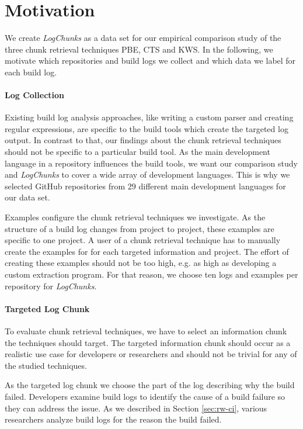 \documentclass[\myrootdir/main.tex]{subfiles}
\begin{document}
\section{Motivation}
We create \emph{LogChunks} as a data set for our empirical comparison study of the three chunk retrieval techniques PBE, CTS and KWS\@.
In the following, we motivate which repositories and build logs we collect and which data we label for each build log.

\paragraph{Log Collection}
Existing build log analysis approaches, like writing a custom parser and creating regular expressions, are specific to the build tools which create the targeted log output.
In contrast to that, our findings about the chunk retrieval techniques should not be specific to a particular build tool.
As the main development language in a repository influences the build tools, we want our comparison study and \emph{LogChunks} to cover a wide array of development languages.
This is why we selected GitHub repositories from 29 different main development languages for our data set.

Examples configure the chunk retrieval techniques we investigate.
As the structure of a build log changes from project to project, these examples are specific to one project.
A user of a chunk retrieval technique has to manually create the examples for for each targeted information and project.
The effort of creating these examples should not be too high, e.g. as high as developing a custom extraction program.
For that reason, we choose ten logs and examples per repository for \emph{LogChunks}.

\paragraph{Targeted Log Chunk}
To evaluate chunk retrieval techniques, we have to select an information chunk the techniques should target.
The targeted information chunk should occur as a realistic use case for developers or researchers and should not be trivial for any of the studied techniques.

As the targeted log chunk we choose the part of the log describing why the build failed.
Developers examine build logs to identify the cause of a build failure so they can address the issue.
As we described in Section \ref{sec:rw-ci}, various researchers analyze build logs for the reason the build failed.
\end{document}
